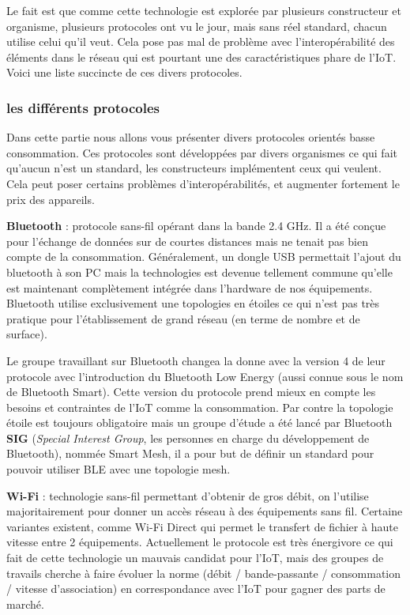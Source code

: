 Le fait est que comme cette technologie est explorée par plusieurs constructeur et organisme, plusieurs protocoles ont vu le jour, mais sans réel standard, chacun utilise celui qu'il veut. Cela pose pas mal de problème avec l'interopérabilité des éléments dans le réseau qui est pourtant une des caractéristiques phare de l'IoT. Voici une liste succincte de ces divers protocoles.

\subsubsection{les différents protocoles}

Dans cette partie nous allons vous présenter divers protocoles orientés basse consommation. Ces protocoles sont développées par divers organismes ce qui fait qu'aucun n'est un standard, les constructeurs implémentent ceux qui veulent. Cela peut poser certains problèmes d'interopérabilités, et augmenter fortement le prix des appareils.

\textbf{Bluetooth} : protocole sans-fil opérant dans la bande 2.4 GHz. Il a été conçue pour l'échange de données sur de courtes distances mais ne tenait pas bien compte de la consommation. Généralement, un dongle USB permettait l'ajout du bluetooth à son PC mais la technologies est devenue tellement commune qu'elle est maintenant complètement intégrée dans l'hardware de nos équipements. Bluetooth utilise exclusivement une topologies en étoiles ce qui n'est pas très pratique pour l'établissement de grand réseau (en terme de nombre et de surface).

Le groupe travaillant sur Bluetooth changea la donne avec la version 4 de leur protocole avec l'introduction du Bluetooth Low Energy (aussi connue sous le nom de Bluetooth Smart). Cette version du protocole prend mieux en compte les besoins et contraintes de l'IoT comme la consommation. Par contre la topologie étoile est toujours obligatoire mais un groupe d'étude a été lancé par Bluetooth \textbf{SIG} (\textit{Special Interest Group}, les personnes en charge du développement de Bluetooth), nommée Smart Mesh, il a pour but de définir un standard pour pouvoir utiliser BLE avec une topologie mesh.

\textbf{Wi-Fi} : technologie sans-fil permettant d'obtenir de gros débit, on l'utilise majoritairement pour donner un accès réseau à des équipements sans fil. Certaine variantes existent, comme Wi-Fi Direct qui permet le transfert de fichier à haute vitesse entre 2 équipements. Actuellement le protocole est très énergivore ce qui fait de cette technologie un mauvais candidat pour l'IoT, mais des groupes de travails cherche à faire évoluer la norme (débit / bande-passante / consommation / vitesse d'association) en correspondance avec l'IoT pour gagner des parts de marché.

